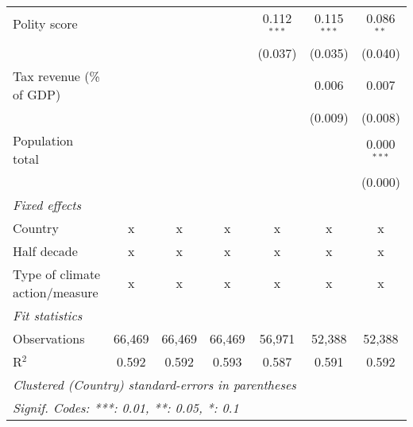 \begin{tabular}{lcccccc}
   Polity score                                                      &               &                &                & 0.112$^{***}$  & 0.115$^{***}$  & 0.086$^{**}$\\   
                                                                     &               &                &                & (0.037)        & (0.035)        & (0.040)\\   
   Tax revenue (\% of GDP)                                           &               &                &                &                & 0.006          & 0.007\\   
                                                                     &               &                &                &                & (0.009)        & (0.008)\\   
   Population total                                                  &               &                &                &                &                & 0.000$^{***}$\\   
                                                                     &               &                &                &                &                & (0.000)\\   
   \emph{Fixed effects}\\
   Country                                                           & x             & x              & x              & x              & x              & x\\  
   Half decade                                                       & x             & x              & x              & x              & x              & x\\  
   Type of climate action/measure                                    & x             & x              & x              & x              & x              & x\\  
   \midrule \emph{Fit statistics}\\
   Observations                                                      & 66,469        & 66,469         & 66,469         & 56,971         & 52,388         & 52,388\\  
   R$^2$                                                             & 0.592         & 0.592          & 0.593          & 0.587          & 0.591          & 0.592\\  
   \midrule
   \multicolumn{7}{l}{\emph{Clustered (Country) standard-errors in parentheses}}\\
   \multicolumn{7}{l}{\emph{Signif. Codes: ***: 0.01, **: 0.05, *: 0.1}}\\
\end{tabular}
\par\endgroup


